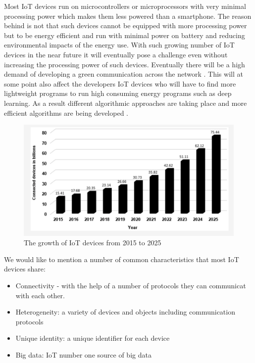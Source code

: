 Most IoT devices run on microcontrollers or microprocessors with very minimal processing power which makes them less powered than a smartphone. The reason behind is not that such devices cannot be equipped with more processing power but to be energy efficient and run with minimal power on battery and reducing environmental impacts of the energy use. With such growing number of IoT devices in the near future it will eventually pose a challenge even without increasing the processing power of such devices. Eventually there will be a high demand of developing a green communication across the network \cite{7057878}. This will at some point also affect the developers IoT devices who will have to find more lightweight programs to run high consuming energy programs such as deep learning. As a result different algorithmic approaches are taking place and more efficient algorithms are being developed \cite{8057306}.






\begin{figure}[!htb]
    \centering
    \includegraphics[width=1\textwidth]{figures/number_of_iot.png}
    \caption{The growth of IoT devices from 2015 to 2025 \cite{bdcc4040028}}
    \label{fig:num_of_iot}
\end{figure}


We would like to mention a number of common characteristics that most IoT devices share: 

\begin{itemize}
    \item Connectivity - with the help of a number of protocols they can communicat with each other.
    \item Heterogeneity: a variety of devices and objects including communication protocols
    \item Unique identity: a unique identifier for each device 
    \item Big data: IoT number one source of big data 
\end{itemize}

